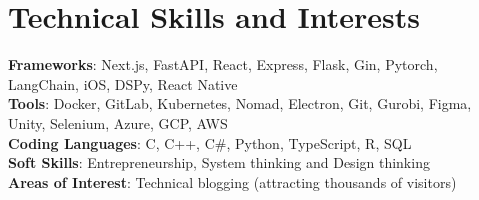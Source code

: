 \documentclass[a4paper,11pt]{article}
\begin{document}
\section{\textbf{Technical Skills and Interests}}
\begin{itemize}[leftmargin=0.05in, label={}]
  \small{\item{
                \textbf{Frameworks}{: Next.js, FastAPI, React, Express, Flask, Gin, Pytorch, LangChain, iOS, DSPy, React Native} \\
                \textbf{Tools}{: Docker, GitLab, Kubernetes, Nomad, Electron, Git,  Gurobi, Figma, Unity, Selenium, Azure, GCP, AWS} \\
                \textbf{Coding Languages}{: C, C++, C\#, Python, TypeScript, R, SQL} \\
                \textbf{Soft Skills}{: Entrepreneurship, System thinking and Design thinking} \\
                \textbf{Areas of Interest}{: Technical blogging (attracting thousands of visitors)} \\
          }}
\end{itemize}
\vspace{-16pt}
\end{document}
